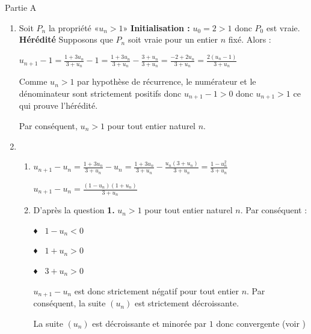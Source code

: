 \begin{corrige}
     \begin{h3}Partie A\end{h3}
     \begin{enumerate}
          \item
          Soit $P_{n}$ la propriété «$u_{n} > 1$»
          \textbf{Initialisation :}
          $u_{0}=2 > 1$ donc $P_{0}$ est vraie.
          \textbf{Hérédité}
          Supposons que $P_{n}$ soit vraie pour un entier $n$ fixé. Alors :
          \par
          $u_{n+1}-1=\frac{1+3u_{n}}{3+u_{n}}-1=\frac{1+3u_{n}}{3+u_{n}}-\frac{3+u_{n}}{3+u_{n}}=\frac{-2+2u_{n}}{3+u_{n}}=\frac{2\left(u_{n}-1\right)}{3+u_{n}}$
          \par
          Comme $u_{n} > 1$ par hypothèse de récurrence, le numérateur et le dénominateur sont strictement positifs donc  $u_{n+1}-1 > 0$ donc $u_{n+1} > 1$ ce qui prouve l'hérédité.
          \par
          Par conséquent, $u_{n} > 1$  pour tout entier naturel $n$.
          \item
          \begin{enumerate}[label=\alph*.]
               \item
               $u_{n+1}- u_{n}=\frac{1+3u_{n}}{3+u_{n}}-u_{n}=\frac{1+3u_{n}}{3+u_{n}}-\frac{u_{n}\left(3+u_{n}\right)}{3+u_{n}}=\frac{1-u_{n}^{2}}{3+u_{n}}$
               \par
               $u_{n+1}- u_{n}=\frac{\left(1-u_{n} \right)\left(1+u_{n}\right)}{3+ u_{n}}$
               \item
               D'après la question \textbf{1.} $u_{n} > 1$  pour tout entier naturel $n$. Par conséquent :
               \par
               ♦  $1-u_{n} < 0$
               \par
               ♦  $1+u_{n} > 0$
               \par
               ♦  $3+u_{n} > 0$
               \par
               $u_{n+1}- u_{n}$ est donc strictement négatif pour tout entier $n$. Par conséquent, la suite $\left(u_{n}\right)$ est strictement décroissante.
               \par
               La suite $\left(u_{n}\right)$ est décroissante et minorée par $1$ donc convergente (voir )
          \end{enumerate}
     \end{enumerate}

\end{corrige}
